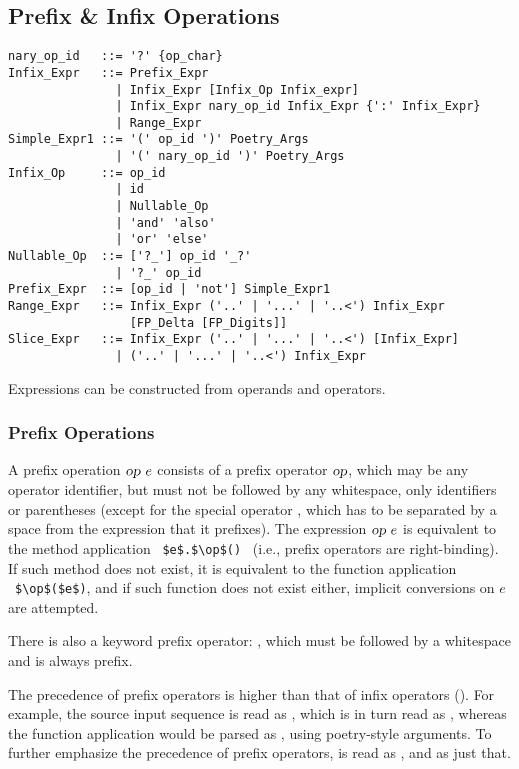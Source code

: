 \subsection{Prefix \& Infix Operations}
\label{sec:prefix-infix-ops}

\syntax\begin{lstlisting}
nary_op_id   ::= '?' {op_char}
Infix_Expr   ::= Prefix_Expr
               | Infix_Expr [Infix_Op Infix_expr]
               | Infix_Expr nary_op_id Infix_Expr {':' Infix_Expr}
               | Range_Expr
Simple_Expr1 ::= '(' op_id ')' Poetry_Args
               | '(' nary_op_id ')' Poetry_Args
Infix_Op     ::= op_id 
               | id
               | Nullable_Op
               | 'and' 'also'
               | 'or' 'else'
Nullable_Op  ::= ['?_'] op_id '_?'
               | '?_' op_id
Prefix_Expr  ::= [op_id | 'not'] Simple_Expr1
Range_Expr   ::= Infix_Expr ('..' | '...' | '..<') Infix_Expr
                 [FP_Delta [FP_Digits]]
Slice_Expr   ::= Infix_Expr ('..' | '...' | '..<') [Infix_Expr]
               | ('..' | '...' | '..<') Infix_Expr
\end{lstlisting}

Expressions can be constructed from operands and operators. 





\subsubsection{Prefix Operations}

A prefix operation $\mbox{\sl op}\ e$ consists of a prefix operator $\mbox{\sl op}$, which may be any operator identifier, but must not be followed by any whitespace, only identifiers or parentheses (except for the special operator , which has to be separated by a space from the expression that it prefixes). The expression $\mbox{\sl op}\ e$ is equivalent to the method application ~\lstinline!$e$.$\op$()!~ (i.e., prefix operators are right-binding). If such method does not exist, it is equivalent to the function application ~\lstinline!$\op$($e$)!, and if such function does not exist either, implicit conversions on $e$ are attempted. 

There is also a keyword prefix operator: , which must be followed by a whitespace and is always prefix.

The precedence of prefix operators is higher than that of infix operators (). For example, the source input sequence  is read as , which is in turn read as , whereas the function application  would be parsed as , using poetry-style arguments. To further emphasize the precedence of prefix operators,  is read as , and  as just that. 


